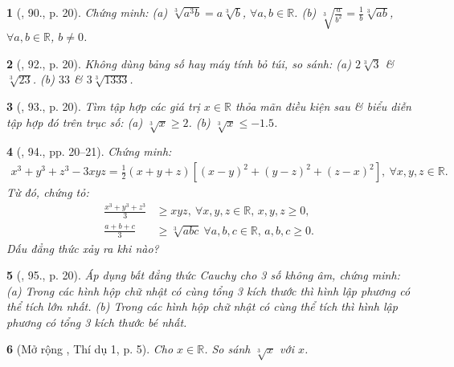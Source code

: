 \documentclass{article}
\newtheorem{baitoan}{}%
\begin{document}
\begin{baitoan}[\cite{SBT_Toan_9_tap_1}, 90., p. 20]
	Chứng minh: (a) $\sqrt[3]{a^3b} = a\sqrt[3]{b}$, $\forall a,b\in\mathbb{R}$. (b) $\sqrt[3]{\frac{a}{b^2}} = \frac{1}{b}\sqrt[3]{ab}$, $\forall a,b\in\mathbb{R}$, $b\ne0$.
\end{baitoan}

\begin{baitoan}[\cite{SBT_Toan_9_tap_1}, 92., p. 20]
	Không dùng bảng số hay máy tính bỏ túi, so sánh: (a) $2\sqrt[3]{3}$ \& $\sqrt[3]{23}$. (b) $33$ \& $3\sqrt[3]{1333}$.
\end{baitoan}

\begin{baitoan}[\cite{SBT_Toan_9_tap_1}, 93., p. 20]
	Tìm tập hợp các giá trị $x\in\mathbb{R}$ thỏa mãn điều kiện sau \& biểu diễn tập hợp đó trên trục số: (a) $\sqrt[3]{x}\ge2$. (b) $\sqrt[3]{x}\le-1.5$.
\end{baitoan}

\begin{baitoan}[\cite{SBT_Toan_9_tap_1}, 94., pp. 20--21]
	Chứng minh:
	\begin{align*}
		x^3 + y^3 + z^3 - 3xyz = \frac{1}{2}(x + y + z)\left[(x - y)^2 + (y - z)^2 + (z - x)^2\right],\ \forall x,y,z\in\mathbb{R}.
	\end{align*}
	Từ đó, chứng tỏ:
	\begin{align*}
		\frac{x^3 + y^3 + z^3}{3}&\ge xyz,\ \forall x,y,z\in\mathbb{R},\,x,y,z\ge0,\\
		\frac{a + b + c}{3}&\ge\sqrt[3]{abc}\ \forall a,b,c\in\mathbb{R},\,a,b,c\ge0.
	\end{align*}
	Dấu đẳng thức xảy ra khi nào?
\end{baitoan}

\begin{baitoan}[\cite{SBT_Toan_9_tap_1}, 95., p. 20]
	Áp dụng bất đẳng thức Cauchy cho 3 số không âm, chứng minh: (a) Trong các hình hộp chữ nhật có cùng tổng 3 kích thước thì hình lập phương có thể tích lớn nhất. (b) Trong các hình hộp chữ nhật có cùng thể tích thì hình lập phương có tổng 3 kích thước bé nhất.
\end{baitoan}

\begin{baitoan}[Mở rộng \cite{Tuyen_Toan_9_old}, Thí dụ 1, p. 5]
	Cho $x\in\mathbb{R}$. So sánh $\sqrt[3]{x}$ với $x$.
\end{baitoan}
\end{document}
